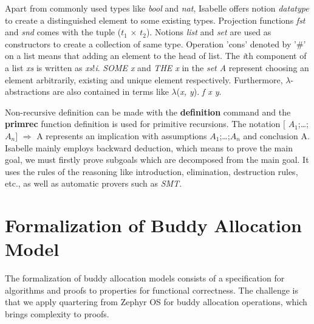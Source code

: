 \documentclass[runningheads]{llncs}
\begin{document}
Apart from commonly used types like \textsl{bool} and \textsl{nat}, Isabelle offers notion \textsl{datatype} to create a distinguished element to some existing types. Projection functions \textsl{fst} and \textsl{snd} comes with the tuple (\textsl{$t_1$} $\times$ \textsl{$t_2$}). Notions \textsl{list} and \textsl{set} are used as constructors to create a collection of same type. Operation 'cons' denoted by '$\#$' on a list means that adding an element to the head of list. The \textsl{i}th component of a list \textsl{xs} is written as \textsl{xs}!\textsl{i}. \textsl{SOME x} and \textsl{THE x} in the \textsl{set A} represent choosing an element arbitrarily, existing and unique element respectively. Furthermore, $\lambda$-abstractions are also contained in terms like $\lambda$(\textsl{x, y}). \textsl{f x y}.

Non-recursive definition can be made with the \textbf{definition} command and the \textbf{primrec} function definition is used for primitive recursions. The notation $\lbrack$ $A_1$;\dots;$A_n$$\rbrack$ $\Longrightarrow$ A represents an implication with assumptions $A_1$;\dots;$A_n$ and conclusion A. Isabelle mainly employs backward deduction, which means to prove the main goal, we must firstly prove subgoals which are decomposed from the main goal. It uses the rules of the reasoning like introduction, elimination, destruction rules, etc., as well as automatic provers such as \textsl{SMT}.


\section{Formalization of Buddy Allocation Model}
The formalization of buddy allocation models consists of a specification for algorithms and proofs to properties for functional correctness. The challenge is that we apply quartering from Zephyr OS for buddy allocation operations, which brings complexity to proofs.
\end{document}
